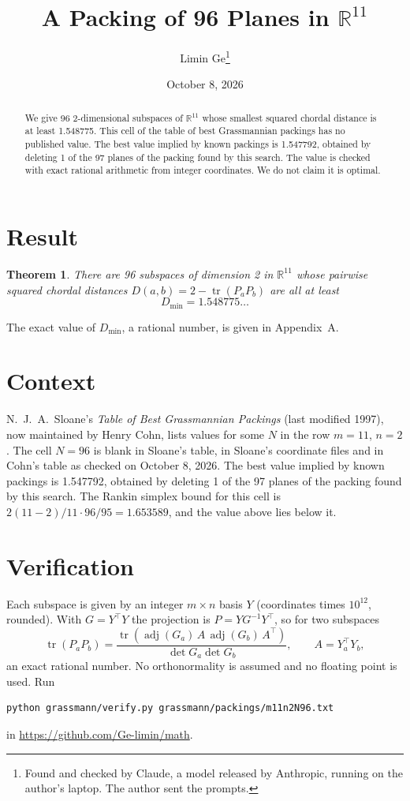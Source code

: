 \documentclass[11pt,a4paper]{article}
\title{A Packing of 96 Planes in $\mathbb{R}^{11}$}
\author{Limin Ge\thanks{Found and checked by Claude, a model released by Anthropic, running on the author's laptop. The author sent the prompts.}}
\date{October 8, 2026}
\newtheorem*{theorem}{Theorem}
\begin{document}
\maketitle
\begin{abstract}
We give 96 2-dimensional subspaces of $\mathbb{R}^{11}$ whose smallest squared chordal distance is at least 1.548775. This cell of the table of best Grassmannian packings has no published value. The best value implied by known packings is 1.547792, obtained by deleting 1 of the 97 planes of the packing found by this search. The value is checked with exact rational arithmetic from integer coordinates. We do not claim it is optimal.
\end{abstract}

\section{Result}
\begin{theorem}
There are 96 subspaces of dimension 2 in $\mathbb{R}^{11}$ whose pairwise squared chordal distances $D(a,b) = 2 - \operatorname{tr}(P_aP_b)$ are all at least
\[ D_{\min} = 1.548775\ldots \]
\end{theorem}
The exact value of $D_{\min}$, a rational number, is given in Appendix~A.


\section{Context}
N.~J.~A.~Sloane's \emph{Table of Best Grassmannian Packings} (last modified 1997), now maintained by Henry Cohn, lists values for some $N$ in the row $m=11$, $n=2$. The cell $N=96$ is blank in Sloane's table, in Sloane's coordinate files and in Cohn's table as checked on October 8, 2026. The best value implied by known packings is 1.547792, obtained by deleting 1 of the 97 planes of the packing found by this search. The Rankin simplex bound for this cell is $2(11-2)/11\cdot 96/95 = 1.653589$, and the value above lies below it.


\section{Verification}
Each subspace is given by an integer $m\times n$ basis $Y$ (coordinates times $10^{12}$, rounded). With $G=Y^\top Y$ the projection is $P=YG^{-1}Y^\top$, so for two subspaces
\[ \operatorname{tr}(P_aP_b)=\frac{\operatorname{tr}(\operatorname{adj}(G_a)\,A\,\operatorname{adj}(G_b)\,A^\top)}{\det G_a\det G_b},\qquad A=Y_a^\top Y_b, \]
an exact rational number. No orthonormality is assumed and no floating point is used. Run
\begin{verbatim}
python grassmann/verify.py grassmann/packings/m11n2N96.txt
\end{verbatim}
in \url{https://github.com/Ge-limin/math}.
\end{document}
